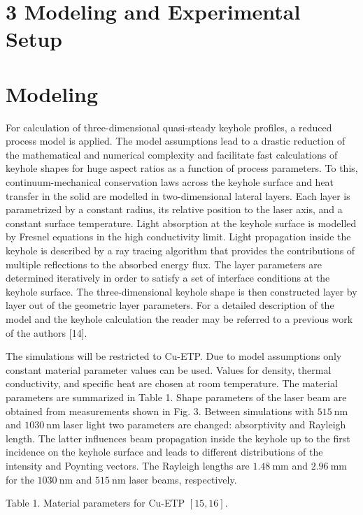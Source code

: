 \documentclass[10pt]{article}
\begin{document}
\section*{3 Modeling and Experimental Setup}
\section*{Modeling}
For calculation of three-dimensional quasi-steady keyhole profiles, a reduced process model is applied. The model assumptions lead to a drastic reduction of the mathematical and numerical complexity and facilitate fast calculations of keyhole shapes for huge aspect ratios as a function of process parameters. To this, continuum-mechanical conservation laws across the keyhole surface and heat transfer in the solid are modelled in two-dimensional lateral layers. Each layer is parametrized by a constant radius, its relative position to the laser axis, and a constant surface temperature. Light absorption at the keyhole surface is modelled by Fresnel equations in the high conductivity limit. Light propagation inside the keyhole is described by a ray tracing algorithm that provides the contributions of multiple reflections to the absorbed energy flux. The layer parameters are determined iteratively in order to satisfy a set of interface conditions at the keyhole surface. The three-dimensional keyhole shape is then constructed layer by layer out of the geometric layer parameters. For a detailed description of the model and the keyhole calculation the reader may be referred to a previous work of the authors [14].

The simulations will be restricted to Cu-ETP. Due to model assumptions only constant material parameter values can be used. Values for density, thermal conductivity, and specific heat are chosen at room temperature. The material parameters are summarized in Table 1. Shape parameters of the laser beam are obtained from measurements shown in Fig. 3. Between simulations with $515 \mathrm{~nm}$ and $1030 \mathrm{~nm}$ laser light two parameters are changed: absorptivity and Rayleigh length. The latter influences beam propagation inside the keyhole up to the first incidence on the keyhole surface and leads to different distributions of the intensity and Poynting vectors. The Rayleigh lengths are $1.48 \mathrm{~mm}$ and $2.96 \mathrm{~mm}$ for the $1030 \mathrm{~nm}$ and $515 \mathrm{~nm}$ laser beams, respectively.

Table 1. Material parameters for Cu-ETP $[15,16]$.
\end{document}
